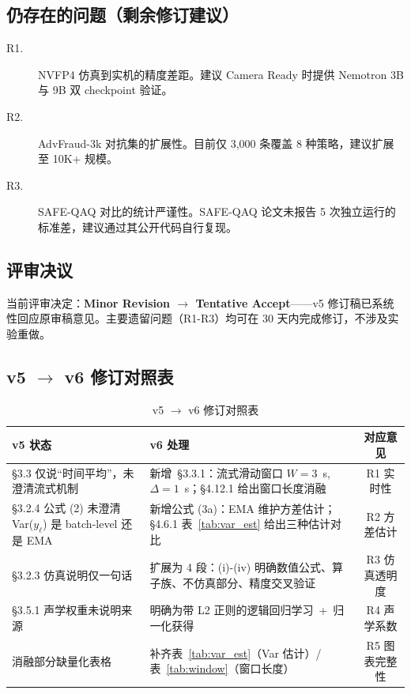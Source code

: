 \documentclass[UTF8,a4paper,10pt,twocolumn]{ctexart}
\theoremstyle{plain}
\begin{document}
\subsection{仍存在的问题（剩余修订建议）}

\begin{description}
\item[R1.] NVFP4 仿真到实机的精度差距。建议 Camera Ready 时提供 Nemotron 3B 与 9B 双 checkpoint 验证。
\item[R2.] AdvFraud-3k 对抗集的扩展性。目前仅 3,000 条覆盖 8 种策略，建议扩展至 10K+ 规模。
\item[R3.] SAFE-QAQ 对比的统计严谨性。SAFE-QAQ 论文未报告 5 次独立运行的标准差，建议通过其公开代码自行复现。
\end{description}

\subsection{评审决议}

当前评审决定：\textbf{Minor Revision $\to$ Tentative Accept}——v5 修订稿已系统性回应原审稿意见。主要遗留问题（R1-R3）均可在 30 天内完成修订，不涉及实验重做。

\subsection{v5 $\to$ v6 修订对照表}

\begin{table}[H]
\centering
\caption{v5 $\to$ v6 修订对照表}
\label{tab:v5v6}
\small
\begin{tabular}{p{4cm}p{5cm}c}
\toprule
v5 状态 & v6 处理 & 对应意见 \\
\midrule
\S3.3 仅说“时间平均”，未澄清流式机制 & 新增~\S3.3.1：流式滑动窗口 $W=3$~s, $\Delta=1$~s；\S4.12.1 给出窗口长度消融 & R1 实时性 \\
\S3.2.4 公式 (2) 未澄清 Var($y_\ell$) 是 batch-level 还是 EMA & 新增公式 (3a)：EMA 维护方差估计；\S4.6.1 表~\ref{tab:var_est} 给出三种估计对比 & R2 方差估计 \\
\S3.2.3 仿真说明仅一句话 & 扩展为 4 段：(i)-(iv) 明确数值公式、算子族、不仿真部分、精度交叉验证 & R3 仿真透明度 \\
\S3.5.1 声学权重未说明来源 & 明确为带 L2 正则的逻辑回归学习~+~归一化获得 & R4 声学系数 \\
消融部分缺量化表格 & 补齐表~\ref{tab:var_est}（Var 估计）/ 表~\ref{tab:window}（窗口长度） & R5 图表完整性 \\
\bottomrule
\end{tabular}
\end{table}
\end{document}
